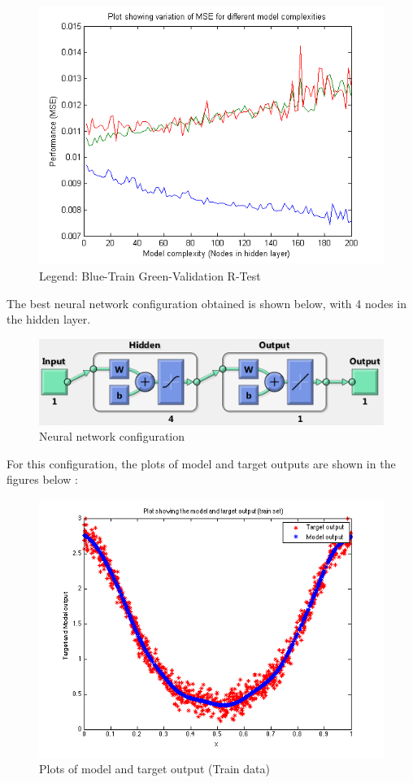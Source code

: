 \documentclass{article}
\begin{document}
\begin{figure}[H]
\centering
\includegraphics[width=\linewidth]{Regression/univariate/mse.png}
\caption{Legend: Blue-Train  Green-Validation R-Test}
\end{figure}

The best neural network configuration obtained is shown below, with 4 nodes in the hidden layer.



\begin{figure}[H]
\centering
\includegraphics[width=\linewidth]{Regression/univariate/net_config.png}
\caption{Neural network configuration}
\end{figure}

For this configuration, the plots of model and target outputs are shown in the figures below : 

\begin{figure}[H]
\centering
\includegraphics[width=0.5\linewidth]{Regression/univariate/trainOutput.png}
\caption{Plots of model and target output (Train data)}
\end{figure}
\end{document}
